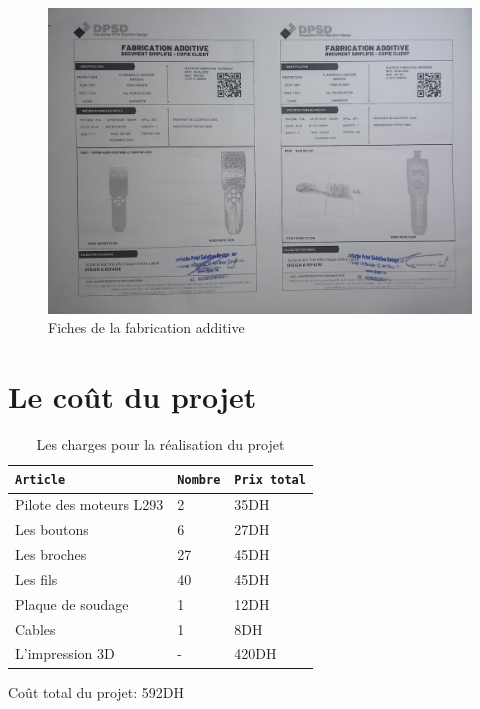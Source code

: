 \begin{figure}[!htbp]
    \centering
    \includegraphics[height=.4\textheight]{assets/realisation/dpsd/3.jpg}
    \caption{Fiches de la fabrication additive}
\end{figure}

\FloatBarrier

\section{Le coût du projet}

\bgroup
\def\arraystretch{1.5}%
\begin{table}[!htbp]
    \centering
    \begin{tabular}{|C{6cm}|C{2cm}|C{4cm}|}
        \hline
        \verb|Article| & \verb|Nombre| & \verb|Prix total| \\
        \hline
        Pilote des moteurs L293 & 2 & 35DH \\
        \hline
        Les boutons & 6 & 27DH \\
        \hline
        Les broches & 27 & 45DH \\
        \hline
        Les fils & 40 & 45DH \\
        \hline
        Plaque de soudage & 1 & 12DH \\
        \hline
        Cables & 1 & 8DH \\
        \hline
        L'impression 3D & - & 420DH \\
        \hline
    \end{tabular}
    \caption{Les charges pour la réalisation du projet}
\end{table}
\egroup

Coût total du projet: 592DH